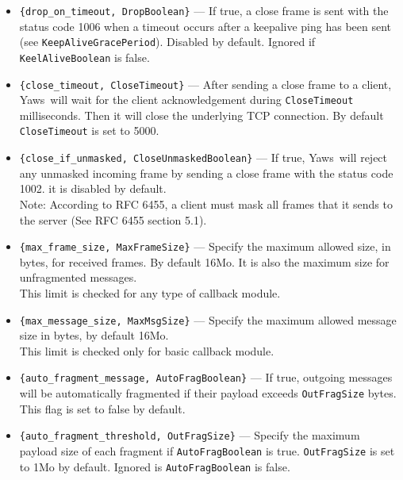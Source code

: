 \documentclass[11pt,oneside,english]{book}
\newcommand{\Yaws}            %
        {{\sc Yaws}}
\begin{document}
\begin{itemize}
    \item \verb+{drop_on_timeout, DropBoolean}+ ---
      If true, a close frame is sent with the status code 1006 when a timeout
      occurs after a keepalive ping has been sent (see
      \verb+KeepAliveGracePeriod+). Disabled by default. Ignored if
      \verb+KeelAliveBoolean+ is false.

    \item \verb+{close_timeout, CloseTimeout}+ ---
      After sending a close frame to a client, \Yaws\ will wait for the client
      acknowledgement during \verb+CloseTimeout+ milliseconds. Then it will
      close the underlying TCP connection. By default \verb+CloseTimeout+ is set
      to 5000.

    \item \verb+{close_if_unmasked, CloseUnmaskedBoolean}+ ---
      If true, \Yaws\ will reject any unmasked incoming frame by sending a close
      frame with the status code 1002. it is disabled by default.\\ Note:
      According to RFC 6455, a client must mask all frames that it sends to the
      server (See RFC 6455 section 5.1).

    \item \verb+{max_frame_size, MaxFrameSize}+ ---
      Specify the maximum allowed size, in bytes, for received frames. By
      default 16Mo. It is also the maximum size for unfragmented
      messages.\\ This limit is checked for any type of callback module.

    \item \verb+{max_message_size, MaxMsgSize}+ ---
      Specify the maximum allowed message size in bytes, by default 16Mo.\\ This
      limit is checked only for basic callback module.

    \item \verb+{auto_fragment_message, AutoFragBoolean}+ ---
      If true, outgoing messages will be automatically fragmented if their
      payload exceeds \verb+OutFragSize+ bytes. This flag is set to false by
      default.

    \item \verb+{auto_fragment_threshold, OutFragSize}+ ---
      Specify the maximum payload size of each fragment if
      \verb+AutoFragBoolean+ is true. \verb+OutFragSize+ is set to 1Mo by
      default. Ignored is \verb+AutoFragBoolean+ is false.
\end{itemize}
\end{document}
